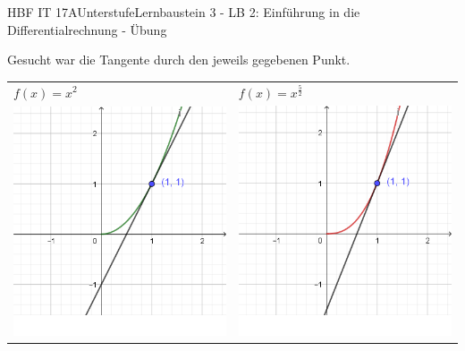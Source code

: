 \documentclass[oneside,openany,headings=optiontotoc,11pt,numbers=noenddot]{scrreprt}
\begin{document}
	\begin{worksheet}{HBF IT 17A}{Unterstufe}{Lernbaustein 3 - LB 2: Einführung in die Differentialrechnung - Übung}
		
		\noindent
		\begin{framed}
			\noindent
			Gesucht war die Tangente durch den jeweils gegebenen Punkt.
			\begin{center}
				\begin{tabularx}{\textwidth}{XX}
					\(f(x) = x^2\) & \(f(x) = x^{\frac{5}{2}}\)\\
					\includegraphics[scale=0.3]{Bilder/At.png} & \includegraphics[scale=0.3]{Bilder/Bt.png}\\

\end{tabularx}
\end{center}
\end{framed}
\end{worksheet}
\end{document}
